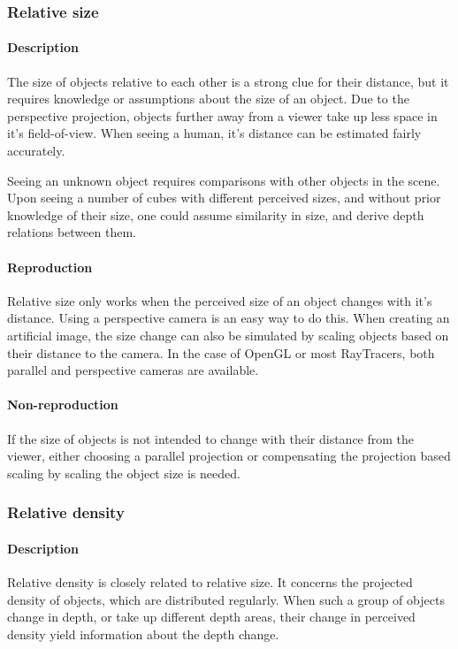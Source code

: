 \subsubsection{Relative size}
\paragraph{Description}
The size of objects relative to each other is a strong clue for their distance, but it requires knowledge or assumptions about the size of an object. Due to the perspective projection, objects further away from a viewer take up less space in it's field-of-view. When seeing a human, it's distance can be estimated fairly accurately.

Seeing an unknown object requires comparisons with other objects in the scene. Upon seeing a number of cubes with different perceived sizes, and without prior knowledge of their size, one could assume similarity in size, and derive depth relations between them.

\paragraph{Reproduction}
Relative size only works when the perceived size of an object changes with it's distance. Using a perspective camera is an easy way to do this. When creating an artificial image, the size change can also be simulated by scaling objects based on their distance to the camera. In the case of OpenGL or most RayTracers, both parallel and perspective cameras are available.

\paragraph{Non-reproduction}
If the size of objects is not intended to change with their distance from the viewer, either choosing a parallel projection or compensating the projection based scaling by scaling the object size is needed.


\subsubsection{Relative density}
\paragraph{Description}
Relative density is closely related to relative size. It concerns the projected density of objects, which are distributed regularly. When such a group of objects change in depth, or take up different depth areas, their change in perceived density yield information about the depth change.

